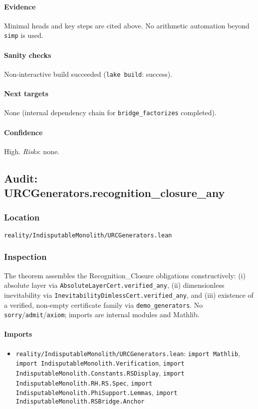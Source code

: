 \documentclass{article}
\newcommand{\FileRef}[1]{\texttt{#1}}
\begin{document}
\paragraph{Evidence}
Minimal heads and key steps are cited above. No arithmetic automation beyond \texttt{simp} is used.

\paragraph{Sanity checks}
Non-interactive build succeeded (\texttt{lake build}: success).

\paragraph{Next targets} None (internal dependency chain for \texttt{bridge\_factorizes} completed).

\paragraph{Confidence} High. \textit{Risks}: none.

\subsection{Audit: URCGenerators.recognition\_closure\_any}
\subsubsection{Location}
\FileRef{reality/IndisputableMonolith/URCGenerators.lean}

\subsubsection{Inspection}
The theorem assembles the Recognition\_Closure obligations constructively: (i) absolute layer via \texttt{AbsoluteLayerCert.verified\_any}, (ii) dimensionless inevitability via \texttt{InevitabilityDimlessCert.verified\_any}, and (iii) existence of a verified, non-empty certificate family via \texttt{demo\_generators}. No \texttt{sorry}/\texttt{admit}/\texttt{axiom}; imports are internal modules and Mathlib.

\paragraph{Imports}
\begin{itemize}[leftmargin=*]
  \item \FileRef{reality/IndisputableMonolith/URCGenerators.lean}: \texttt{import Mathlib}, \texttt{import IndisputableMonolith.Verification}, \texttt{import IndisputableMonolith.Constants.RSDisplay}, \texttt{import IndisputableMonolith.RH.RS.Spec}, \texttt{import IndisputableMonolith.PhiSupport.Lemmas}, \texttt{import IndisputableMonolith.RSBridge.Anchor}
\end{itemize}
\end{document}
